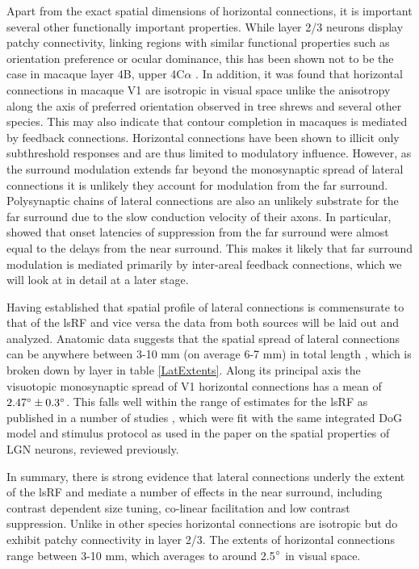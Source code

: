 Apart from the exact spatial dimensions of horizontal connections, it
is important several other functionally important properties. While
layer 2/3 neurons display patchy connectivity, linking regions with
similar functional properties such as orientation preference or ocular
dominance, this has been shown not to be the case in macaque layer 4B,
upper 4C$\alpha$ \citep{Angelucci2002}. In addition, it was found that
horizontal connections in macaque V1 are isotropic in visual space
unlike the anisotropy along the axis of preferred orientation observed
in tree shrews \citep{Bosking1997} and several other species. This may
also indicate that contour completion in macaques is mediated by
feedback connections. Horizontal connections have been shown to
illicit only subthreshold responses \citep{Hirsch1991} and are thus
limited to modulatory influence. However, as the surround modulation
extends far beyond the monosynaptic spread of lateral connections it
is unlikely they account for modulation from the far
surround. Polysynaptic chains of lateral connections are also an
unlikely substrate for the far surround due to the slow conduction
velocity of their axons. In particular, \cite{Bair2003} showed that
onset latencies of suppression from the far surround were almost equal
to the delays from the near surround. This makes it likely that far
surround modulation is mediated primarily by inter-areal feedback
connections, which we will look at in detail at a later stage.

Having established that spatial profile of lateral connections is
commensurate to that of the lsRF and vice versa the data from both
sources will be laid out and analyzed. Anatomic data suggests that the
spatial spread of lateral connections can be anywhere between 3-10 mm
(on average 6-7 mm) in total length \citep{Angelucci2002}, which is
broken down by layer in table \ref{LatExtents}. Along its principal
axis the visuotopic monosynaptic spread of V1 horizontal connections
has a mean of $2.47\degree \pm 0.3\degree$. This falls well within the
range of estimates for the lsRF as published in a number of studies
\citep{Shushruth2009,Sceniak1999,Sceniak2001}, which were fit with the
same integrated DoG model and stimulus protocol as used in the
\cite{Sceniak2006} paper on the spatial properties of LGN neurons,
reviewed previously.

In summary, there is strong evidence that lateral connections underly
the extent of the lsRF and mediate a number of effects in the near
surround, including contrast dependent size tuning, co-linear
facilitation and low contrast suppression. Unlike in other species
horizontal connections are isotropic but do exhibit patchy
connectivity in layer 2/3. The extents of horizontal connections range
between 3-10 mm, which averages to around 2.5$\degree$ in visual
space.


